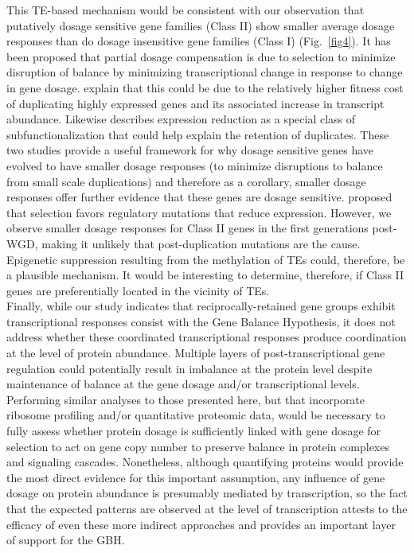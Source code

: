 \documentclass[11pt]{article}
\begin{document}
This TE-based mechanism would be consistent with our observation that putatively dosage sensitive gene families (Class II) show smaller average dosage responses than do dosage insensitive gene families (Class I) (Fig.~\ref{fig4}).
It has been proposed that partial dosage compensation is due to selection to minimize disruption of balance by minimizing transcriptional change in response to change in gene dosage.
\cite{katju2018} explain that this could be due to the relatively higher fitness cost of duplicating highly expressed genes and its associated increase in transcript abundance.
Likewise \cite{qian2010} describes expression reduction as a special class of subfunctionalization that could help explain the retention of duplicates.
These two studies provide a useful framework for why dosage sensitive genes have evolved to have smaller dosage responses (to minimize disruptions to balance from small scale duplications) and therefore as a corollary, smaller dosage responses offer further evidence that these genes are dosage sensitive.
\cite{qian2010} proposed that selection favors regulatory mutations that reduce expression.
However, we observe smaller dosage responses for Class II genes in the first generations post-WGD, making it unlikely that post-duplication mutations are the cause.
Epigenetic suppression resulting from the methylation of TEs could, therefore, be a plausible mechanism.
It would be interesting to determine, therefore, if Class II genes are preferentially located in the vicinity of TEs.\\

Finally, while our study indicates that reciprocally-retained gene groups exhibit transcriptional responses consist with the Gene Balance Hypothesis, it does not address whether these coordinated transcriptional responses produce coordination at the level of protein abundance.
Multiple layers of post-transcriptional gene regulation could potentially result in imbalance at the protein level despite maintenance of balance at the gene dosage and/or transcriptional levels.
Performing similar analyses to those presented here, but that incorporate ribosome profiling \citep{taggart2018} and/or quantitative proteomic data, would be necessary to fully assess whether protein dosage is sufficiently linked with gene dosage for selection to act on gene copy number to preserve balance in protein complexes and signaling cascades.
Nonetheless, although quantifying proteins would provide the most direct evidence for this important assumption, any influence of gene dosage on protein abundance is presumably mediated by transcription, so the fact that the expected patterns are observed at the level of transcription attests to the efficacy of even these more indirect approaches and provides an important layer of support for the GBH.\\
\end{document}
